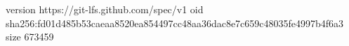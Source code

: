 version https://git-lfs.github.com/spec/v1
oid sha256:fd01d485b53caeaa8520ea854497cc48aa36dac8e7c659c48035fe4997b4f6a3
size 673459
